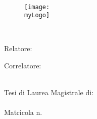 %
%
%
\begin{titlepage}
	\begin{addmargin}[-1cm]{-3cm}
	\begin{center}
		\spacedlowsmallcaps{\myUni} \\
		\bigskip\myFaculty \\
		\medskip\mySchool \\
		\medskip\myDepartment \\
		\bigskip\myCourseFirstPartIT \\
		\medskip\myCourseSecondPartIT \\  
		
		\hfill
		
		\vfill
		
		\begin{figure}[!h]
			\begin{addmargin}[-1cm]{-3cm}
				\centering
				\texttt{[image: \\myLogo]} %
			\end{addmargin}
		\end{figure}
		
		\vfill
		
		\begingroup
		\LARGE %
		\color{Maroon} \myTitleIT \\ \bigskip
		\endgroup
		
		\vfill
		
		\flushleft 
		\small{Relatore:}\\ %
		\medskip\spacedlowsmallcaps{\mySupervisor}
		
		\flushleft
		\small{Correlatore:}\\ %
		\medskip\spacedlowsmallcaps{\myOtherSupervisor}\\
		
		\vfill  
		
		\flushright
		\small{Tesi di Laurea Magistrale di:}\\ %
		\medskip \spacedlowsmallcaps{\myFirstAuthorName}\\
		Matricola n. \myMatrFirstAuthor \\ 
		
		\vfill 
		
		\centering {\myAcademicYear}                     
		
	\end{center}
	\end{addmargin}
\end{titlepage}